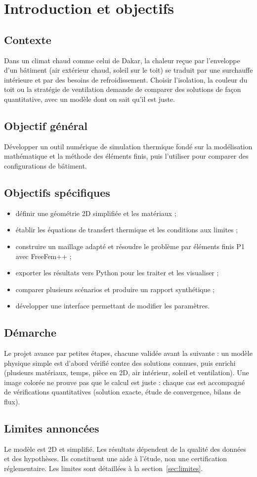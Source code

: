 \section{Introduction et objectifs}

\subsection{Contexte}
Dans un climat chaud comme celui de Dakar, la chaleur reçue par l'enveloppe d'un bâtiment (air extérieur
chaud, soleil sur le toit) se traduit par une surchauffe intérieure et par des besoins de refroidissement.
Choisir l'isolation, la couleur du toit ou la stratégie de ventilation demande de comparer des solutions
de façon quantitative, avec un modèle dont on sait qu'il est juste.

\subsection{Objectif général}
Développer un outil numérique de simulation thermique fondé sur la modélisation mathématique et la
méthode des éléments finis, puis l'utiliser pour comparer des configurations de bâtiment.

\subsection{Objectifs spécifiques}
\begin{itemize}
  \item définir une géométrie 2D simplifiée et les matériaux ;
  \item établir les équations de transfert thermique et les conditions aux limites ;
  \item construire un maillage adapté et résoudre le problème par éléments finis P1 avec FreeFem++ ;
  \item exporter les résultats vers Python pour les traiter et les visualiser ;
  \item comparer plusieurs scénarios et produire un rapport synthétique ;
  \item développer une interface permettant de modifier les paramètres.
\end{itemize}

\subsection{Démarche}
Le projet avance par petites étapes, chacune validée avant la suivante : un modèle physique simple est
d'abord vérifié contre des solutions connues, puis enrichi (plusieurs matériaux, temps, pièce en 2D,
air intérieur, soleil et ventilation). Une image colorée ne prouve pas que le calcul est juste : chaque
cas est accompagné de vérifications quantitatives (solution exacte, étude de convergence, bilans de flux).

\subsection{Limites annoncées}
Le modèle est 2D et simplifié. Les résultats dépendent de la qualité des données et des hypothèses.
Ils constituent une aide à l'étude, non une certification réglementaire. Les limites sont détaillées
à la section~\ref{sec:limites}.
